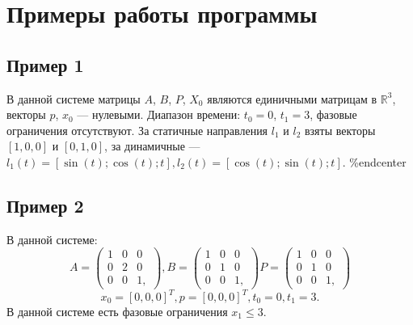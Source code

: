 \documentclass[12pt]{article}
\begin{document}
\section{Примеры работы программы}
	\subsection{Пример 1}
		В данной системе матрицы $A$, $B$, $P$, $X_0$ являются единичными матрицам в $\mathbb{R}^3$, векторы $p$, $x_0$ --- нулевыми. Диапазон времени: $t_0 = 0$, $t_1 = 3$, фазовые ограничения отсутствуют. За статичные направления $l_1$ и $l_2$ взяты векторы $[1, 0, 0]$ и $[0, 1, 0]$, за динамичные --- $l_1(t) = [\sin(t); \cos(t); t], l_2(t) = [\cos(t); \sin(t); t]$.
	\%end{center}			
	\subsection{Пример 2}
	В данной системе:
	$$A =
	\begin{pmatrix}
		1 & 0 & 0 \\
		0 & 2 & 0 \\
		0 & 0 & 1,
	\end{pmatrix}, 
	B = 
	\begin{pmatrix}
		1 & 0 & 0 \\
		0 & 1 & 0 \\
		0 & 0 & 1,
	\end{pmatrix}
	P = 
	\begin{pmatrix}
		1 & 0 & 0 \\
		0 & 1 & 0 \\
		0 & 0 & 1,
	\end{pmatrix}
	$$	
	$$
		x_0 = [0, 0, 0]^{T}, p = [0, 0, 0]^{T}, t_0 = 0, t_1 = 3.
	$$
	В данной системе есть фазовые ограничения $x_1 \leqslant 3$.
		
\end{document}
